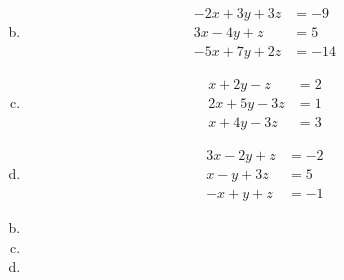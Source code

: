 \documentclass[../main.tex]{subfiles}
\begin{document}
\begin{enumerate}[a)]
	\setcounter{enumi}{1}
	\item 
		\begin{align*}
			-2x + 3y + 3z &= -9 \\
			3x - 4y + z &= 5 \\
			-5x + 7y + 2z &= -14
		\end{align*}
	\setcounter{enumi}{3}
	\item 
		\begin{align*}
			x + 2y - z &= 2 \\
			2x + 5y - 3z &= 1 \\
			x + 4y - 3z &= 3
		\end{align*}
	\setcounter{enumi}{5}
	\item 
		\begin{align*}
			3x - 2y + z &= -2 \\
			x - y + 3z &= 5 \\
			-x + y + z &= -1
		\end{align*}
\end{enumerate}

\solution
\begin{enumerate}[a)]
	\setcounter{enumi}{1}
	\item 
	\setcounter{enumi}{3}
	\item 
	\setcounter{enumi}{5}
	\item 
\end{enumerate}
\end{document}
